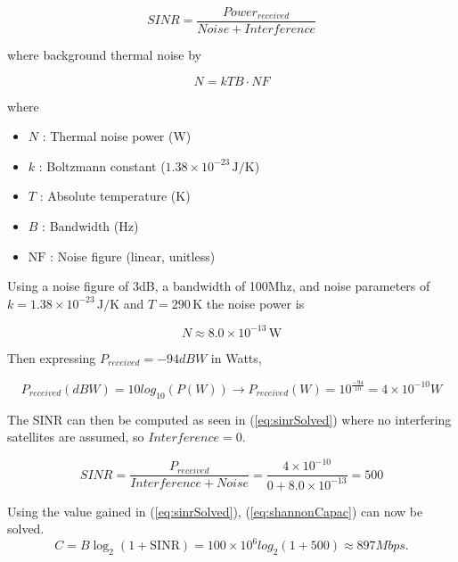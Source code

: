 \begin{equation}
\label{eq:snr}
    SINR = \frac{Power_{received}}{Noise + Interference}
\end{equation}

where background thermal noise by 

\begin{equation}
\label{eq:noise}
    N = kTB \cdot NF
\end{equation}

where 
\begin{itemize}
  \item $N$ : Thermal noise power (W)
  \item $k$ : Boltzmann constant ($1.38 \times 10^{-23}\,\text{J/K}$)
  \item $T$ : Absolute temperature (K)
  \item $B$ : Bandwidth (Hz)
  \item $\mathrm{NF}$ : Noise figure (linear, unitless)
\end{itemize}

Using a noise figure of 3dB, a bandwidth of 100Mhz, and noise parameters of $k = 1.38 \times 10^{-23}\,\mathrm{J/K}$ \quad and \quad $T = 290\,\mathrm{K}$ the noise power is 

\begin{equation}
N \approx 8.0 \times 10^{-13}\,\mathrm{W}
\end{equation}

Then expressing $P_{received}= -94 dBW$ in Watts,

\begin{equation}
    P_{received}(dBW) = 10log_{10}(P(W)) \rightarrow P_{received}(W) = 10^{\frac{-94}{10}} = 4 \times 10^ {-10} W
\end{equation}

The SINR can then be computed as seen in (\ref{eq:sinrSolved}) where no interfering satellites are assumed, so $Interference = 0$.

\begin{equation}
\label{eq:sinrSolved}
    SINR = \frac{P_{received}}{Interference + Noise} = \frac{4 \times 10 ^{-10}}{0 + 8.0 \times 10^{-13}} = 500
\end{equation}


Using the value gained in (\ref{eq:sinrSolved}), (\ref{eq:shannonCapac}) can now be solved.  
\begin{equation}
\label{eq:shannonCapac}
C = B \log_2 (1 + \mathrm{SINR}) = 100 \times 10^6log_2(1+500) \approx 897 Mbps. 
\end{equation}

